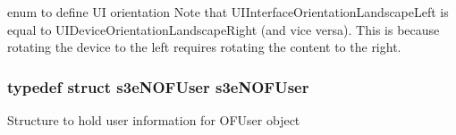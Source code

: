 enum to define UI orientation Note that UIInterfaceOrientationLandscapeLeft is equal to UIDeviceOrientationLandscapeRight (and vice versa). This is because rotating the device to the left requires rotating the content to the right. \hypertarget{group___n_open_feint_api_group_ga038694687b332e497536920f13f4b0f3}{
\subsubsection[{s3eNOFUser}]{\setlength{\rightskip}{0pt plus 5cm}typedef struct {\bf s3eNOFUser}  {\bf s3eNOFUser}}}
\label{group___n_open_feint_api_group_ga038694687b332e497536920f13f4b0f3}
Structure to hold user information for OFUser object 

